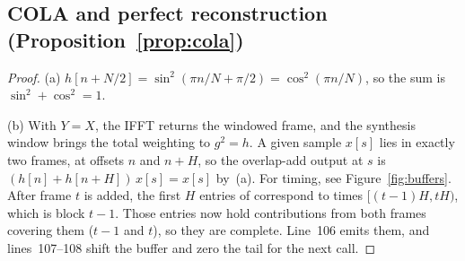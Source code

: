 \documentclass[11pt]{article}
\begin{document}
\subsection{COLA and perfect reconstruction (Proposition~\ref{prop:cola})}\label{prf:cola}
\begin{proof}
(a) $h[n+N/2]=\sin^2(\pi n/N+\pi/2)=\cos^2(\pi n/N)$, so the sum is $\sin^2+\cos^2=1$.

(b) With $Y=X$, the IFFT returns the windowed frame, and the synthesis window brings the
total weighting to $g^2=h$. A given sample $x[s]$ lies in exactly two frames, at offsets
$n$ and $n+H$, so the overlap-add output at $s$ is $(h[n]+h[n+H])\,x[s]=x[s]$ by~(a).
For timing, see Figure~\ref{fig:buffers}. After frame $t$ is added, the first $H$ entries of
 correspond to times $[(t-1)H,tH)$, which is block $t-1$. Those entries now hold
contributions from both frames covering them ($t-1$ and $t$), so they are complete. Line~106
emits them, and lines~107--108 shift the buffer and zero the tail for the next call.
\end{proof}

\end{document}
